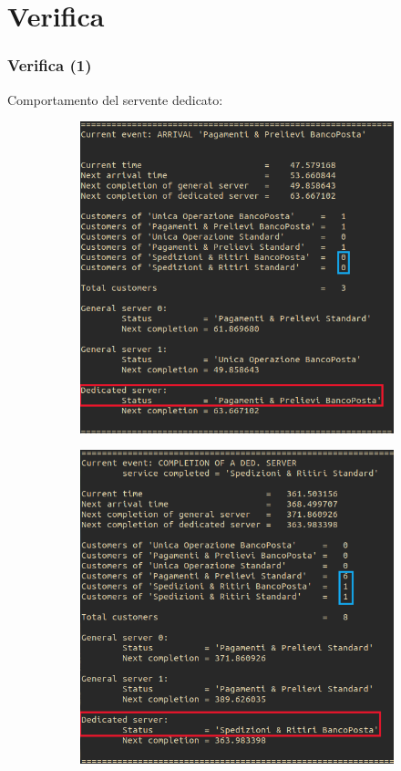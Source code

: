 \documentclass[
	usepdftitle=false,
	xcolor={table, dvipsnames},
	hyperref={
		pdftitle={Studio delle prestazioni di un Ufficio Postale ispirato a Poste Italiane},
    	pdfauthor={A. Chillotti, C. Cuffaro e S. Tiberi}
    }
]{beamer}
\begin{document}
\section{Verifica}
\begin{frame}
\frametitle{Verifica (1)}
Comportamento del servente dedicato:
\begin{figure}[ht]
\centering
\begin{subfigure}[b]{0.475\textwidth}
\centering
\includegraphics[width=\textwidth]{screenshots/original/ded_server_changes_behaviour}
\end{subfigure}
\hfill    
\begin{subfigure}[b]{0.475\textwidth}  
\centering 
\includegraphics[width=\textwidth]{screenshots/original/ded_server_priority_sched}

\end{subfigure}
\end{figure}
\end{frame}
\end{document}

